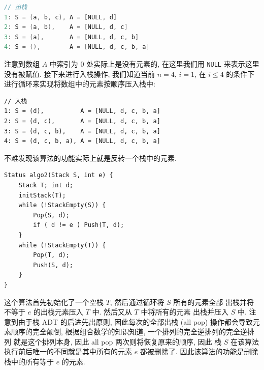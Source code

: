 \documentclass[10pt,UTF8]{book} %
\begin{document}
\begin{exercise}
\begin{cmt}
\begin{lstlisting}[language=C]
// 出栈
1: S = (a, b, c), A = [NULL, d]
2: S = (a, b),    A = [NULL, d, c]
3: S = (a),       A = [NULL, d, c, b]
4: S = (),        A = [NULL, d, c, b, a]
        \end{lstlisting}
        注意到数组 $A$ 中索引为 $0$ 处实际上是没有元素的,
        在这里我们用 \lstinline|NULL| 来表示这里没有被赋值.
        接下来进行入栈操作, 我们知道当前 $n=4$, $i=1$, 在 $i \leqslant 4$
        的条件下进行循环来实现将数组中的元素按顺序压入栈中:
\begin{lstlisting}
// 入栈
1: S = (d),          A = [NULL, d, c, b, a]
2: S = (d, c),       A = [NULL, d, c, b, a]
3: S = (d, c, b),    A = [NULL, d, c, b, a]
4: S = (d, c, b, a), A = [NULL, d, c, b, a]
\end{lstlisting}
        不难发现该算法的功能实际上就是反转一个栈中的元素.
    \end{cmt}
\begin{lstlisting}
Status algo2(Stack S, int e) {
    Stack T; int d;
    initStack(T);
    while (!StackEmpty(S)) {
        Pop(S, d);
        if ( d != e ) Push(T, d);
    }
    while (!StackEmpty(T)) {
        Pop(T, d);
        Push(S, d);
    }
}
\end{lstlisting}
\begin{cmt}
    这个算法首先初始化了一个空栈 $T$, 然后通过循环将 $S$ 所有的元素全部
    出栈并将不等于 $e$ 的出栈元素压入 $T$ 中. 然后又从 $T$ 中将所有的元素
    出栈并压入 $S$ 中. 注意到由于栈 ADT 的后进先出原则, 因此每次的全部出栈 (all pop)
    操作都会导致元素顺序的完全颠倒, 根据组合数学的知识知道,
    一个排列的完全逆排列的完全逆排列
    就是这个排列本身, 因此 all pop 两次则将恢复原来的顺序,
    因此 栈 $S$  在该算法执行前后唯一的不同就是其中所有的元素 $e$
    都被删除了. 因此该算法的功能是删除栈中的所有等于 $e$ 的元素.
\end{cmt}
\end{exercise}
\end{document}
